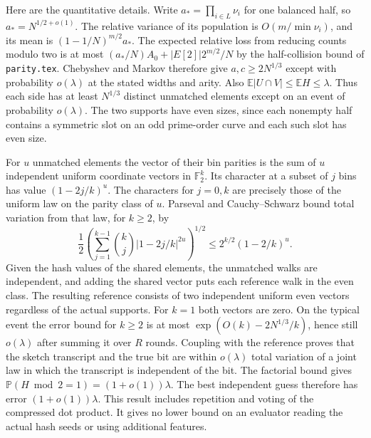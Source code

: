 \documentclass[11pt]{article}
\newcommand{\E}{\mathbb E}
\newcommand{\Prb}{\mathbb P}
\begin{document}
Here are the quantitative details. Write $a_*=\prod_{i\in L}\nu_i$
for one balanced half, so $a_*=N^{1/2+o(1)}$. The relative variance
of its population is $O(m/\min\nu_i)$, and its mean is
$(1-1/N)^{m/2}a_*$. The expected relative loss from reducing counts
modulo two is at most
$(a_*/N)A_0+|E[2]|2^{m/2}/N$ by the half-collision bound of
\texttt{parity.tex}. Chebyshev and Markov therefore give
$a,c\ge2N^{1/3}$ except with probability $o(\lambda)$ at the stated
widths and arity. Also $\E|U\cap V|\le\E H\le\lambda$. Thus each
side has at least $N^{1/3}$ distinct unmatched elements except on
an event of probability $o(\lambda)$. The two supports have even
sizes, since each nonempty half contains a symmetric slot on an
odd prime-order curve and each such slot has even size.

For $u$ unmatched elements the vector of their bin parities is the
sum of $u$ independent uniform coordinate vectors in $\mathbb F_2^k$.
Its character at a subset of $j$ bins has value $(1-2j/k)^u$.
The characters for $j=0,k$ are precisely those of the uniform law on
the parity class of $u$. Parseval and Cauchy--Schwarz bound total
variation from that law, for $k\ge2$, by
\[
 \frac12\left(\sum_{j=1}^{k-1}\binom kj|1-2j/k|^{2u}\right)^{1/2}
 \le 2^{k/2}(1-2/k)^u .
\]
Given the hash values of the shared elements, the unmatched walks are
independent, and adding the shared vector puts each reference walk in
the even class. The resulting reference consists of two independent
uniform even vectors regardless of the actual supports. For $k=1$
both vectors are zero. On the typical event the error bound for $k\ge2$
is at most $\exp(O(k)-2N^{1/3}/k)$, hence still $o(\lambda)$ after
summing it over $R$ rounds. Coupling with the reference proves that
the sketch transcript and the true bit are within $o(\lambda)$ total
variation of a joint law in which the transcript is independent of
the bit. The factorial bound gives
$\Prb(H\bmod2=1)=(1+o(1))\lambda$. The best independent guess therefore
has error $(1+o(1))\lambda$. This result includes repetition and voting
of the compressed dot product. It gives no lower bound on an evaluator
reading the actual hash seeds or using additional features.
\end{document}
